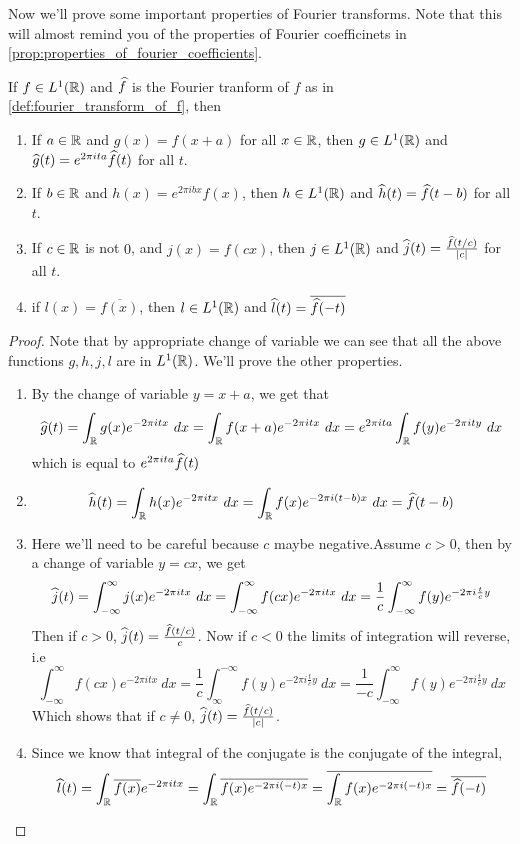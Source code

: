   Now we'll prove some important properties of Fourier transforms. Note that this will almost remind you of the properties of Fourier coefficinets in \autoref{prop:properties_of_fourier_coefficients}. 
  \begin{proposition}
    \label{prop:properties_of_fourier_transform}
    If $f\in L^1(\mathbb R)$ and $\widehat{f}$ is the Fourier tranform of $f$ as in \autoref{def:fourier_transform_of_f}, then 
    \begin{enumerate}[label=(\alph*)]
      \item If $a \in \mathbb R$ and $g(x) = f(x+a)$ for all $x \in \mathbb R$, then $g \in L^1(\mathbb R)$ and $\widehat{g}(t) = e^{2\pi ita} \widehat{f}(t)$ for all $t$.
      \item If $b \in \mathbb R$ and $h(x) = e^{2\pi ibx}f(x)$, then $h \in L^1(\mathbb R)$ and $\widehat{h}(t) = \widehat{f}(t-b)$ for all $t$.
      \item If $c \in \mathbb R$ is not $0$, and $j(x) = f(cx)$, then $j \in L^1(\mathbb R)$ and $\widehat{j}(t) = \frac{\widehat{f}(t/c)}{|c|}$ for all $t$.
      \item if $l(x) = \overline{f(x)}$, then $l\in L^1(\mathbb R)$ and $\widehat{l}(t) = \overline{\widehat{f}(-t)}$
    \end{enumerate}
  \end{proposition}

  \begin{proof}
    Note that by appropriate change of variable we can see that all the above functions $g, h, j, l$ are in $L^1(\mathbb R)$. We'll prove the other properties.
    \begin{enumerate}[label=(\alph*)]
      \item By the change of variable $y = x+a$, we get that
        $$\widehat{g}(t) = \int_{\mathbb R}g(x)e^{-2 \pi itx} \ dx = \int_\mathbb R f(x+a)e^{-2\pi itx} \ dx = e^{2\pi ita}\int_\mathbb R f(y)e^{-2 \pi ity} \ dx$$
        which is equal to $e^{2\pi ita}\widehat{f}(t)$

      \item $$\widehat{h}(t) = \int_{\mathbb R}h(x)e^{-2\pi itx} \ dx = \int_\mathbb R f(x)e^{-2\pi i(t-b)x} \ dx = \widehat{f}(t-b)$$

      \item Here we'll need to be careful because $c$ maybe negative.Assume $c>0$, then by a change of variable $y=cx$, we get $$\widehat{j}(t) = \int_{-\infty}^{\infty} j(x)e^{-2\pi itx} \ dx = \int_{-\infty}^{\infty} f(cx)e^{-2\pi itx} \ dx = \frac{1}{c}\int_{-\infty}^{\infty} f(y)e^{-2\pi i \frac{t}{c}y} $$
        Then if $c>0$, $\widehat{j}(t) = \frac{\widehat{f}(t/c)}{c}$. Now if $c<0$ the limits of integration will reverse, i.e $$\int_{-\infty}^{\infty} f(cx)e^{-2\pi itx} \ dx = \frac{1}{c}\int_{\infty}^{-\infty} f(y)e^{-2\pi i \frac{t}{c}y} \ dx = \frac{1}{-c}\int_{-\infty}^{\infty} f(y)e^{-2\pi i \frac{t}{c}y} \ dx$$
        Which shows that if $c\neq 0$, $\widehat{j}(t) = \frac{\widehat{f}(t/c)}{|c|}$.
      \item Since we know that integral of the conjugate is the conjugate of the integral, $$\widehat{l}(t) = \int_\mathbb R \overline{f(x)} e^{-2\pi itx} = \int_\mathbb R \overline{f(x) e^{-2\pi i(-t)x}} = \overline{\int_\mathbb R f(x) e^{-2\pi i(-t)x}} = \overline{\widehat{f}(-t)}$$
    \end{enumerate}
  \end{proof}

